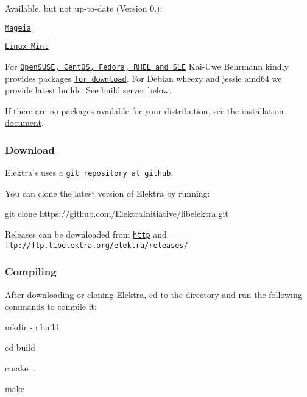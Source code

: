 Available, but not up-\/to-\/date (Version 0.)\+:
\begin{DoxyItemize}
\item \href{http://svnweb.mageia.org/packages/updates/1/elektra/}{\tt Mageia}
\item \href{http://community.linuxmint.com/software/view/elektra}{\tt Linux Mint}
\end{DoxyItemize}

For \href{https://build.opensuse.org/package/show/home:bekun:devel/elektra}{\tt Open\+S\+U\+S\+E, Cent\+O\+S, Fedora, R\+H\+E\+L and S\+L\+E} Kai-\/\+Uwe Behrmann kindly provides packages \href{http://software.opensuse.org/download.html?project=home%3Abekun%3Adevel&package=libelektra4}{\tt for download}. For Debian wheezy and jessie amd64 we provide latest builds. See build server below.

If there are no packages available for your distribution, see the \hyperlink{doc_INSTALL_md}{installation document}.

\subsubsection*{Download}

Elektra's uses a \href{https://github.com/ElektraInitiative/libelektra}{\tt git repository at github}.

You can clone the latest version of Elektra by running\+: \begin{DoxyVerb}     git clone https://github.com/ElektraInitiative/libelektra.git
\end{DoxyVerb}


Releases can be downloaded from \href{http://www.libelektra.org/ftp/elektra/releases/}{\tt http} and {\ttfamily \href{ftp://ftp.libelektra.org/elektra/releases/}{\tt ftp\+://ftp.\+libelektra.\+org/elektra/releases/}}

\subsubsection*{Compiling}

After downloading or cloning Elektra, {\ttfamily cd} to the directory and run the following commands to compile it\+:


\begin{DoxyItemize}
\item {\ttfamily mkdir -\/p build}
\item {\ttfamily cd build}
\item {\ttfamily cmake ..}
\item {\ttfamily make}
\end{DoxyItemize}

